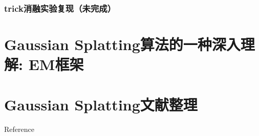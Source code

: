 \documentclass{njupre/njupre}
\begin{document}
\begin{frame}
    \frametitle{trick消融实验复现（未完成）}
\end{frame}

\section{Gaussian Splatting算法的一种深入理解: EM框架}


\section{Gaussian Splatting文献整理}


\begin{frame}[allowframebreaks]{Reference}
    
    
\end{frame}
\end{document}
